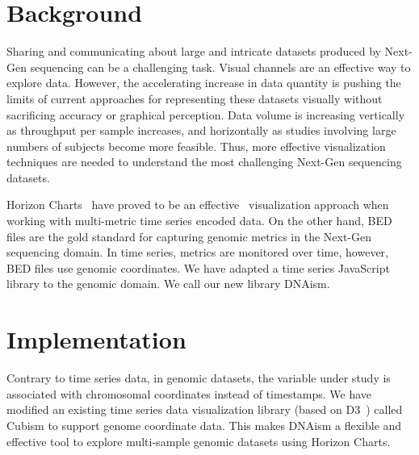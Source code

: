 \documentclass[twocolumn]{bmcart}
\begin{document}
\section*{Background}

Sharing and communicating about large and intricate datasets produced by
Next-Gen sequencing can be a challenging task. Visual channels are an effective
way to explore data. However, the accelerating increase in data quantity is
pushing the limits of current approaches for representing these datasets
visually without sacrificing accuracy or graphical perception.  Data volume is
increasing vertically as throughput per sample increases, and horizontally as
studies involving large numbers of subjects become more feasible.  Thus, more
effective visualization techniques are needed to understand the most
challenging Next-Gen sequencing datasets.

Horizon Charts~\cite{time-in-the-horizon} have proved to be an
effective~\cite{2009-horizon} visualization approach when working with
multi-metric time series encoded data.  On the other hand, BED files are the
gold standard for capturing genomic metrics in the Next-Gen sequencing domain.
In time series, metrics are monitored over time, however, BED files use genomic
coordinates. We have adapted a time series JavaScript library to the genomic
domain. We call our new library DNAism.








\section*{Implementation}

Contrary to time series data, in genomic datasets, the variable under study is
associated with chromosomal coordinates instead of timestamps. We have modified
an existing time series data visualization library (based on D3~\cite{2011-d3})
called Cubism to support genome coordinate data. This makes DNAism a flexible
and effective tool to explore multi-sample genomic datasets using Horizon
Charts.
\end{document}
